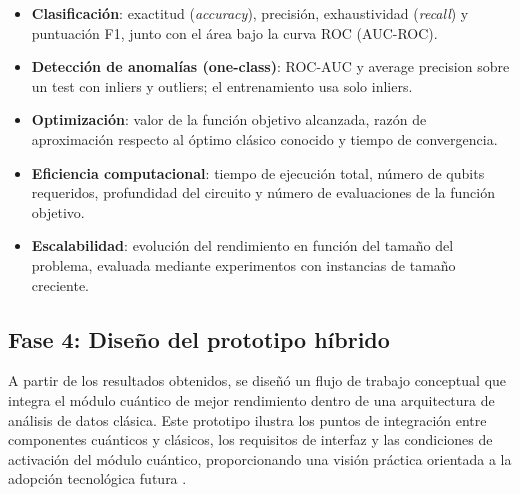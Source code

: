 \begin{itemize}
    \item \textbf{Clasificación}: exactitud (\textit{accuracy}), precisión, exhaustividad (\textit{recall}) y puntuación F1, junto con el área bajo la curva ROC (AUC-ROC).
    \item \textbf{Detección de anomalías (one-class)}: ROC-AUC y average precision sobre un test con inliers y outliers; el entrenamiento usa solo inliers.
    \item \textbf{Optimización}: valor de la función objetivo alcanzada, razón de aproximación respecto al óptimo clásico conocido y tiempo de convergencia.
    \item \textbf{Eficiencia computacional}: tiempo de ejecución total, número de qubits requeridos, profundidad del circuito y número de evaluaciones de la función objetivo.
    \item \textbf{Escalabilidad}: evolución del rendimiento en función del tamaño del problema, evaluada mediante experimentos con instancias de tamaño creciente.
\end{itemize}

\subsection{Fase 4: Diseño del prototipo híbrido}

A partir de los resultados obtenidos, se diseñó un flujo de trabajo conceptual que integra el módulo cuántico de mejor rendimiento dentro de una arquitectura de análisis de datos clásica. Este prototipo ilustra los puntos de integración entre componentes cuánticos y clásicos, los requisitos de interfaz y las condiciones de activación del módulo cuántico, proporcionando una visión práctica orientada a la adopción tecnológica futura \citep{cerezo2021}.

